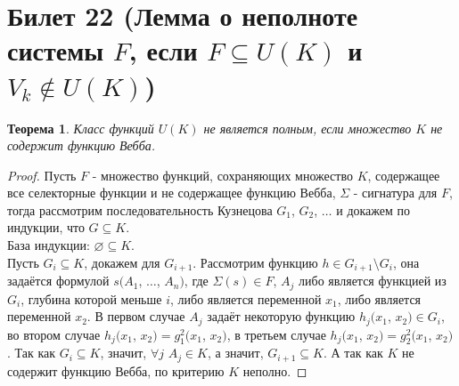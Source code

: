 \documentclass[a4paper, 12pt]{article}
\theoremstyle{definition}
\theoremstyle{plain}
\newtheorem*{theorem}{Теорема}
\theoremstyle{remark}
\begin{document}
  \section{Билет 22 (Лемма о неполноте системы $F$, если $F\subseteq U(K)$ и $V_k\notin U(K)$)}
  \begin{theorem}
    Класс функций $U(K)$ не является полным, если множество $K$ не содержит функцию Вебба.
  \end{theorem}
  \begin{proof}
    Пусть $F$ - множество функций, сохраняющих множество $K$, содержащее все селекторные функции и не содержащее функцию Вебба, $\Sigma$ - сигнатура для $F$, тогда рассмотрим последовательность Кузнецова $G_1$, $G_2$, $\ldots$ и докажем по индукции, что $G\subseteq K$.\\
    База индукции: $\varnothing\subseteq K$.\\
    Пусть $G_i\subseteq K$, докажем для $G_{i+1}$. Рассмотрим функцию $h\in G_{i+1}\setminus G_i$, она задаётся формулой $s(A_1$, $\ldots$, $A_n)$, где $\Sigma(s)\in F$, $A_j$ либо является функцией из $G_i$, глубина которой меньше $i$, либо является переменной $x_1$, либо является переменной $x_2$. В первом случае $A_j$ задаёт некоторую функцию $h_j(x_1$, $x_2)\in G_i$, во втором случае $h_j(x_1$, $x_2)=g_1^2(x_1$, $x_2)$, в третьем случае $h_j(x_1$, $x_2)=g_2^2(x_1$, $x_2)$. Так как $G_i\subseteq K$, значит, $\forall j$ $A_j\in K$, а значит, $G_{i+1}\subseteq K$. А так как $K$ не содержит функцию Вебба, по критерию $K$ неполно.
  \end{proof}
\end{document}

